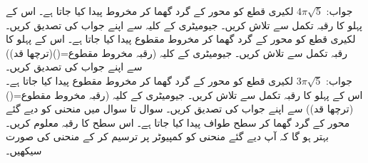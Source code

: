 جواب:\quad
$4\pi \sqrt{5}$
لکیری قطع  کو  محور کے گرد گھما کر مخروط پیدا کیا جاتا ہے۔ اس کے پہلو کا رقبہ تکمل سے تلاش کریں۔ جیومیٹری کے کلیہ سے اپنے جواب کی تصدیق کریں۔
لکیری قطع  کو  محور کے گرد گھما کر مخروط مقطوع پیدا کیا جاتا ہے۔ اس کے پہلو کا رقبہ تکمل سے تلاش کریں۔ جیومیٹری کے کلیہ (رقبہ مخروط مقطوع=()(ترچھا قد)) سے اپنے جواب کی تصدیق کریں۔\\
جواب:\quad
$3\pi \sqrt{5}$
لکیری قطع  کو  محور کے گرد گھما کر مخروط مقطوع پیدا کیا جاتا ہے۔ اس کے پہلو کا رقبہ تکمل سے تلاش کریں۔ جیومیٹری کے کلیہ (رقبہ مخروط مقطوع=()(ترچھا قد)) سے اپنے جواب کی تصدیق کریں۔
سوال  تا سوال  میں منحنی کو دیے گئے محور کے گرد گھما کر سطح  طواف پیدا کیا جاتا ہے۔ اس سطح کا رقبہ معلوم کریں۔ بہتر ہو گا کہ آپ دیے گئے منحنی کو کمپیوٹر پر ترسیم کر کے منحنی کی صورت سیکھیں۔ 

